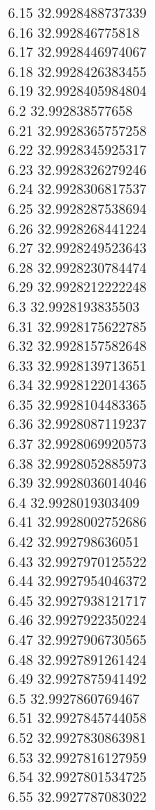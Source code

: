 {6.15	32.9928488737339\\
6.16	32.992846775818\\
6.17	32.9928446974067\\
6.18	32.9928426383455\\
6.19	32.9928405984804\\
6.2	32.992838577658\\
6.21	32.9928365757258\\
6.22	32.9928345925317\\
6.23	32.9928326279246\\
6.24	32.9928306817537\\
6.25	32.9928287538694\\
6.26	32.9928268441224\\
6.27	32.9928249523643\\
6.28	32.9928230784474\\
6.29	32.9928212222248\\
6.3	32.9928193835503\\
6.31	32.9928175622785\\
6.32	32.9928157582648\\
6.33	32.9928139713651\\
6.34	32.9928122014365\\
6.35	32.9928104483365\\
6.36	32.9928087119237\\
6.37	32.9928069920573\\
6.38	32.9928052885973\\
6.39	32.9928036014046\\
6.4	32.9928019303409\\
6.41	32.9928002752686\\
6.42	32.992798636051\\
6.43	32.9927970125522\\
6.44	32.9927954046372\\
6.45	32.9927938121717\\
6.46	32.9927922350224\\
6.47	32.9927906730565\\
6.48	32.9927891261424\\
6.49	32.9927875941492\\
6.5	32.9927860769467\\
6.51	32.9927845744058\\
6.52	32.9927830863981\\
6.53	32.9927816127959\\
6.54	32.9927801534725\\
6.55	32.9927787083022\\
}
